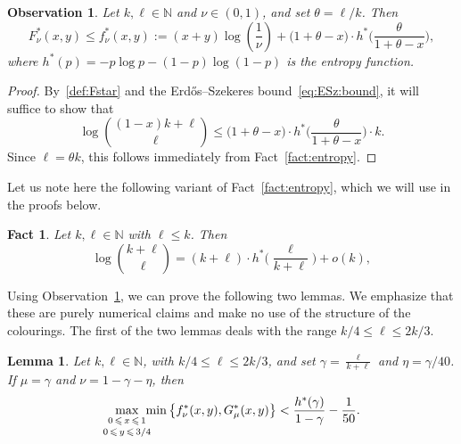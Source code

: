 \documentclass[12pt,reqno]{amsart}
\newtheorem{lemma}[theorem]{Lemma}
\newtheorem{obs}[theorem]{Observation}
\newtheorem{fact}[theorem]{Fact}
\theoremstyle{definition}
\theoremstyle{remark}
\newcommand\N{\mathbb{N}}
\renewcommand{\le}{\leqslant}
\def\N{\mathbb{N}}
\begin{document}
\begin{obs}\label{obs:generalF:ESzbound}
Let $k,\ell \in \N$ and $\nu \in (0,1)$, and set $\theta = \ell / k$. %
Then
$$F^*_\nu(x,y) \le f_\nu^*(x,y) := (x + y)\log \left(\frac{1}{\nu}\right) + \big( 1 + \theta - x \big) \cdot h^*\bigg( \frac{\theta}{1 + \theta - x} \bigg),$$
where $h^*(p) = - p \log p - (1 - p) \log(1 - p)$ is the entropy function.
\end{obs}

\begin{proof}
By~\eqref{def:Fstar} and the Erd\H{o}s--Szekeres bound~\eqref{eq:ESz:bound}, it will suffice to show that 
$$\log {(1-x)k + \ell \choose \ell} \le \big( 1 + \theta - x \big) \cdot h^*\bigg( \frac{\theta}{1 + \theta - x} \bigg) \cdot k.$$
Since $\ell = \theta k$, this follows immediately from Fact~\ref{fact:entropy}. 
\end{proof}

Let us note here the following variant of Fact~\ref{fact:entropy}, which we will use in the proofs below. 

\begin{fact}\label{fact:entropy2}
Let $k,\ell \in \N$ with $\ell \le k$. Then
$$\log {k + \ell \choose \ell} = (k + \ell) \cdot h^*\bigg( \frac{\ell}{k + \ell} \bigg) + o(k),$$
\end{fact}

Using Observation~\ref{obs:generalF:ESzbound}, we can prove the following two lemmas. We emphasize that these are purely numerical claims and make no use of the structure of the colourings. The first of the two lemmas deals with the range $k/4 \le \ell \le 2k/3$. 

\begin{lemma}\label{lem:nearish:calc}
Let $k,\ell \in \N$, with $k/4 \le \ell \le 2k/3$, and set $\gamma = \frac{\ell}{k+\ell}$ and $\eta = \gamma/40$. If\/ $\mu = \gamma$ and $\nu = 1 - \gamma - \eta$, then
$$\max_{\substack{\\[-0.05ex] 0 \,\le\, x \,\le\, 1 \\[+0.3ex] 0 \,\le\, y \,\le\, 3/4}} \hspace{-0.2cm} \min \big\{ f^*_\nu (x,y),G^*_\mu(x,y) \big\} < \frac{h^*(\gamma)}{1-\gamma} - \frac{1}{50}.$$
\end{lemma}
\end{document}
